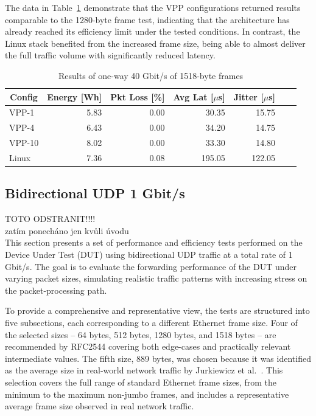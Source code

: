 The data in Table~\ref{tab:40udp:1518B} demonstrate that the VPP configurations returned results comparable to the 1280-byte frame test,
indicating that the architecture has already reached its efficiency limit under the tested conditions.
In contrast, the Linux stack benefited from the increased frame size, being able to almost deliver the full traffic volume with significantly reduced latency.

\begin{table}[h!]
\centering
\caption{Results of one-way 40 Gbit/s of 1518-byte frames}
\begin{tabular}{|l|r|r|r|r|r|r|}
\hline
\multicolumn{1}{|c|}{\textbf{Config}} &
\multicolumn{1}{c|}{\textbf{Energy [Wh] }} &
\multicolumn{1}{c|}{\textbf{Pkt Loss [\%]}} &
\multicolumn{1}{c|}{\textbf{Avg Lat [$\mu$s]}} &
\multicolumn{1}{c|}{\textbf{Jitter [$\mu$s]}} \\
\hline 
VPP-1 & 5.83 & 0.00 & 30.35 & 15.75 \\
VPP-4 & 6.43 & 0.00 & 34.20 & 14.75 \\
VPP-10 & 8.02 & 0.00 & 33.30 & 14.80 \\
Linux & 7.36 & 0.08 & 195.05 & 122.05 \\
\hline
\end{tabular}
\label{tab:40udp:1518B}
\end{table}






\subsection{Bidirectional UDP 1 Gbit/s}
TOTO ODSTRANIT!!!!\\
zatím ponecháno jen kvůli úvodu\\

This section presents a set of performance and efficiency tests performed on the Device Under Test (DUT) using bidirectional UDP traffic at a total rate of 1\,Gbit/s. 
The goal is to evaluate the forwarding performance of the DUT under varying packet sizes, simulating realistic traffic patterns with increasing stress on the packet-processing path.

To provide a comprehensive and representative view, the tests are structured into five subsections, each corresponding to a different Ethernet frame size. 
Four of the selected sizes -- 64 bytes, 512 bytes, 1280 bytes, and 1518 bytes -- are recommended by RFC2544\cite{rfc2544} 
covering both edge-cases and practically relevant intermediate values. 
The fifth size, 889 bytes, was chosen because it was identified as the average size in real-world network traffic by Jurkiewicz et al.~\cite{JURKIEWICZ202115}. 
This selection covers the full range of standard Ethernet frame sizes, from the minimum to the maximum non-jumbo frames, 
and includes a representative average frame size observed in real network traffic.

